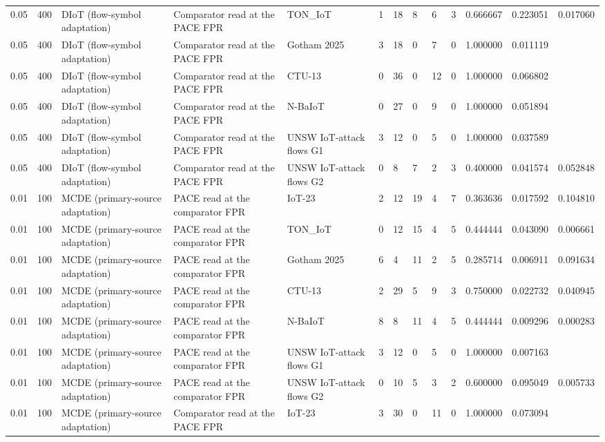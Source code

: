 \begin{tabular}{lllllllllllll}
0.05 & 400 & DIoT (flow-symbol adaptation) & Comparator read at the PACE FPR & TON\_IoT & 1 & 18 & 8 & 6 & 3 & 0.666667 & 0.223051 & 0.017060 \\
0.05 & 400 & DIoT (flow-symbol adaptation) & Comparator read at the PACE FPR & Gotham 2025 & 3 & 18 & 0 & 7 & 0 & 1.000000 & 0.011119 &  \\
0.05 & 400 & DIoT (flow-symbol adaptation) & Comparator read at the PACE FPR & CTU-13 & 0 & 36 & 0 & 12 & 0 & 1.000000 & 0.066802 &  \\
0.05 & 400 & DIoT (flow-symbol adaptation) & Comparator read at the PACE FPR & N-BaIoT & 0 & 27 & 0 & 9 & 0 & 1.000000 & 0.051894 &  \\
0.05 & 400 & DIoT (flow-symbol adaptation) & Comparator read at the PACE FPR & UNSW IoT-attack flows G1 & 3 & 12 & 0 & 5 & 0 & 1.000000 & 0.037589 &  \\
0.05 & 400 & DIoT (flow-symbol adaptation) & Comparator read at the PACE FPR & UNSW IoT-attack flows G2 & 0 & 8 & 7 & 2 & 3 & 0.400000 & 0.041574 & 0.052848 \\
0.01 & 100 & MCDE (primary-source adaptation) & PACE read at the comparator FPR & IoT-23 & 2 & 12 & 19 & 4 & 7 & 0.363636 & 0.017592 & 0.104810 \\
0.01 & 100 & MCDE (primary-source adaptation) & PACE read at the comparator FPR & TON\_IoT & 0 & 12 & 15 & 4 & 5 & 0.444444 & 0.043090 & 0.006661 \\
0.01 & 100 & MCDE (primary-source adaptation) & PACE read at the comparator FPR & Gotham 2025 & 6 & 4 & 11 & 2 & 5 & 0.285714 & 0.006911 & 0.091634 \\
0.01 & 100 & MCDE (primary-source adaptation) & PACE read at the comparator FPR & CTU-13 & 2 & 29 & 5 & 9 & 3 & 0.750000 & 0.022732 & 0.040945 \\
0.01 & 100 & MCDE (primary-source adaptation) & PACE read at the comparator FPR & N-BaIoT & 8 & 8 & 11 & 4 & 5 & 0.444444 & 0.009296 & 0.000283 \\
0.01 & 100 & MCDE (primary-source adaptation) & PACE read at the comparator FPR & UNSW IoT-attack flows G1 & 3 & 12 & 0 & 5 & 0 & 1.000000 & 0.007163 &  \\
0.01 & 100 & MCDE (primary-source adaptation) & PACE read at the comparator FPR & UNSW IoT-attack flows G2 & 0 & 10 & 5 & 3 & 2 & 0.600000 & 0.095049 & 0.005733 \\
0.01 & 100 & MCDE (primary-source adaptation) & Comparator read at the PACE FPR & IoT-23 & 3 & 30 & 0 & 11 & 0 & 1.000000 & 0.073094 &  \\

\end{tabular}
